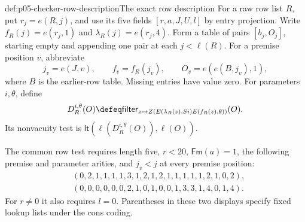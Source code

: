 \begin{hbdefinition}{def:p05-checker-row-description}{The exact row description}
For a raw row list \(R\), put \(r_j=e(R,j)\), and use its five fields
\([r,a,J,U,l]\) by entry projection.  Write \(f_R(j)=e(r_j,1)\) and
\(\lambda_R(j)=e(r_j,4)\).  Form a table of pairs \([b_j,O_j]\),
starting empty and appending one pair at each \(j<\ell(R)\).
For a premise position \(v\), abbreviate
\[
 j_v=e(J,v),\qquad f_v=f_R(j_v),\qquad
 O_v=e(e(B,j_v),1),
\]
where \(B\) is the earlier-row table.  Missing entries have value zero.
For parameters \(i,\theta\), define
\[
 D_R^{i,\theta}(O)\defeq
 \mathsf{filter}_{z\mapsto
    Z(E(\lambda_R(z),Si)E(f_R(z),\theta))}(O).
\]
Its nonvacuity test is \(\mathsf{lt}(\ell(D_R^{i,\theta}(O)),\ell(O))\).

The common row test requires length five, \(r<20\),
\(\mathsf{Fm}(a)=1\), the following premise and parameter arities, and
\(j_v<j\) at every premise position:
\[
\begin{aligned}
 &(0,2,1,1,1,1,3,1,2,1,2,1,1,1,1,1,2,1,0,2),\\
 &(0,0,0,0,0,0,2,1,0,1,0,0,1,3,3,1,4,0,1,4).
\end{aligned}
\]
For \(r\ne0\) it also requires \(l=0\).  Parentheses in these two
displays specify fixed lookup lists under the cons coding.


\end{hbdefinition}

